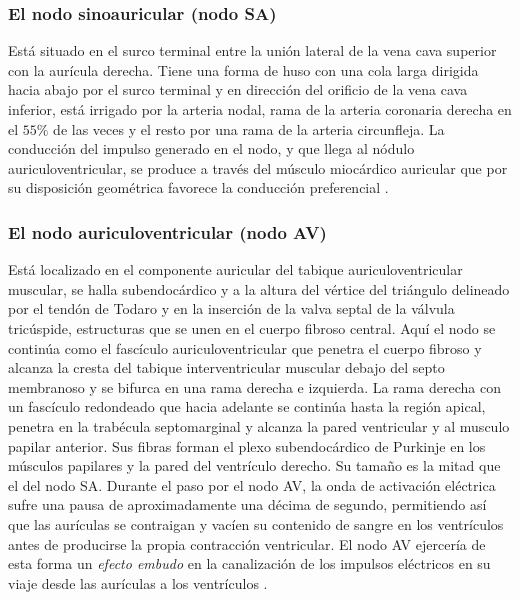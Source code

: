 \documentclass[spanish,11pt,letterpaper,oneside]{memoir}
\begin{document}
	\subsubsection*{El nodo sinoauricular (nodo SA)} 
	Está situado en el surco terminal entre la unión lateral de la vena cava superior con la aurícula derecha. Tiene una forma de huso con una cola larga dirigida hacia abajo por el surco terminal y en dirección del orificio de la vena cava inferior, está irrigado por la arteria nodal, rama de la arteria coronaria derecha en el $55\%$ de las veces y el resto por una rama de la arteria circunfleja. La conducción del impulso generado en el nodo, y que llega al nódulo auriculoventricular, se produce a través del músculo miocárdico auricular que por su disposición geométrica favorece la conducción preferencial \cite{fbbva}. 
	\subsubsection*{El nodo auriculoventricular (nodo AV)}
	Está localizado en el componente auricular del tabique auriculoventricular muscular, se halla subendocárdico y a la altura del vértice del triángulo delineado por el tendón de Todaro y en la inserción de la valva septal de la válvula tricúspide, estructuras que se unen en el cuerpo fibroso central. Aquí el nodo se continúa como el fascículo auriculoventricular que penetra el cuerpo fibroso y alcanza la cresta del tabique interventricular muscular debajo del septo membranoso y se bifurca en una rama derecha e izquierda. La rama derecha con un fascículo redondeado que hacia adelante se continúa hasta la región apical, penetra en la trabécula septomarginal y alcanza la pared ventricular y al musculo papilar anterior. Sus fibras forman el plexo subendocárdico de Purkinje en los músculos papilares y la pared del ventrículo derecho. Su tamaño es la mitad que el del nodo SA. Durante el paso por el nodo AV, la onda de activación eléctrica sufre una pausa de aproximadamente una décima de segundo, permitiendo así que las aurículas se contraigan y vacíen su contenido de sangre en los ventrículos antes de producirse la propia contracción ventricular. El nodo AV ejercería de esta forma un \textit{efecto embudo} en la canalización de los impulsos eléctricos en su viaje desde las aurículas a los ventrículos \cite{fbbva}.
\end{document}
